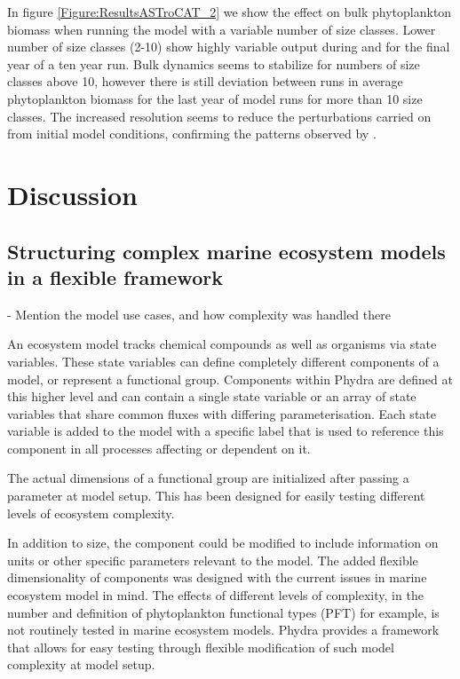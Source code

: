 \documentclass[journal abbreviation, manuscript]{copernicus}
\begin{document}
In figure \ref{Figure:ResultsASTroCAT_2} we show the effect on bulk phytoplankton biomass when running the model with a variable number of size classes. Lower number of size classes (2-10) show highly variable output during and for the final year of a ten year run. Bulk dynamics seems to stabilize for numbers of size classes above 10, however there is still deviation between runs in average phytoplankton biomass for the last year of model runs for more than 10 size classes. The increased resolution seems to reduce the perturbations carried on from initial model conditions, confirming the patterns observed by \citet{Baird2010IncreasingErrors}.


\section{Discussion}

\subsection{Structuring complex marine ecosystem models in a flexible framework}
- Mention the model use cases, and how complexity was handled there

An ecosystem model tracks chemical compounds as well as organisms via state variables. These state variables can define completely different components of a model, or represent a functional group. Components within Phydra are defined at this higher level and can contain a single state variable or an array of state variables that share common fluxes with differing parameterisation. Each state variable is added to the model with a specific label that is used to reference this component in all processes affecting or dependent on it.

The actual dimensions of a functional group are initialized after passing a parameter at model setup. This has been designed for easily testing different levels of ecosystem complexity.

In addition to size, the component could be modified to include information on units or other specific parameters relevant to the model. The added flexible dimensionality of components was designed with the current issues in marine ecosystem model in mind. The effects of different levels of complexity, in the number and definition of phytoplankton functional types (PFT) for example, is not routinely tested in marine ecosystem models. Phydra provides a framework that allows for easy testing through flexible modification of such model complexity at model setup.
\end{document}
